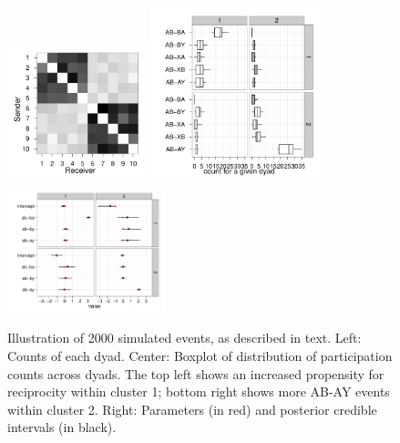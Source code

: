 \documentclass{article}
\begin{document}







\begin{figure}
\center
\includegraphics[width=1.6in]{../figs/synthetic/mat.pdf}
\includegraphics[width=2in]{../figs/synthetic/counts.pdf}
\includegraphics[width=1.8in]{../figs/synthetic/params-estimates.pdf}
\caption{Illustration of 2000 simulated events, as described in text. Left: Counts of each dyad. Center: Boxplot of distribution of participation counts across dyads.  The top left shows an increased propensity for reciprocity within cluster 1; bottom right shows more AB-AY events within cluster 2.  Right: Parameters (in red) and posterior credible intervals (in black).}
\label{fig:syncounts}
\end{figure}
\end{document}

